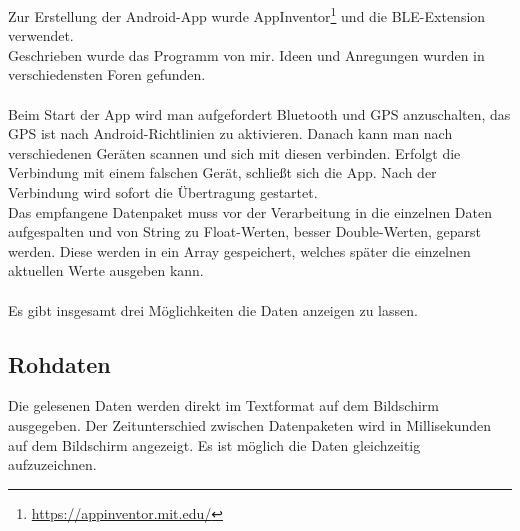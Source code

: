 Zur Erstellung der Android-App wurde AppInventor\footnote{\url{https://appinventor.mit.edu/}} und 
die BLE-Extension verwendet.\\
Geschrieben wurde das Programm von mir. Ideen und Anregungen wurden in verschiedensten 
Foren gefunden. \\
\\
Beim Start der App wird man aufgefordert Bluetooth und GPS anzuschalten, das GPS
ist nach Android-Richtlinien zu aktivieren. Danach kann man nach verschiedenen
Geräten scannen und sich mit diesen verbinden. Erfolgt die Verbindung mit einem
falschen Gerät, schließt sich die App. Nach der Verbindung wird sofort die Übertragung 
gestartet.\\
Das empfangene Datenpaket muss vor der Verarbeitung in die einzelnen Daten
aufgespalten und von String zu Float-Werten, besser Double-Werten, geparst werden.
Diese werden in ein Array gespeichert, welches später
die einzelnen aktuellen Werte ausgeben kann.\\
\\
Es gibt insgesamt drei Möglichkeiten die Daten anzeigen zu lassen.

\subsection{Rohdaten}
Die gelesenen Daten werden direkt im Textformat auf dem Bildschirm ausgegeben.
Der Zeitunterschied zwischen Datenpaketen wird in Millisekunden auf dem Bildschirm
angezeigt.
Es ist möglich die Daten gleichzeitig aufzuzeichnen.

